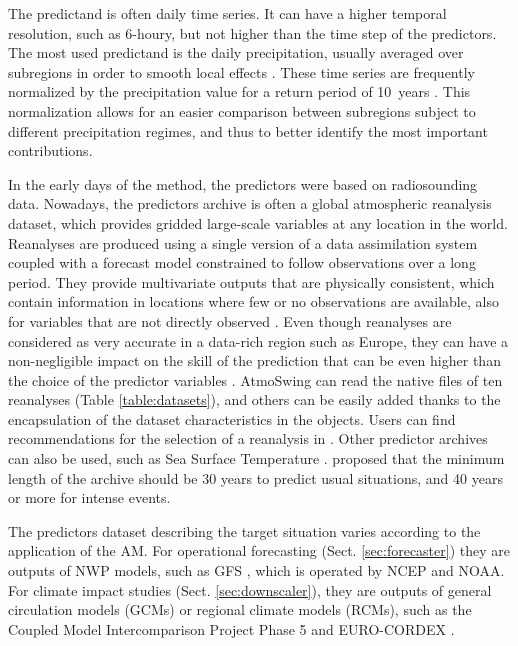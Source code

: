 \documentclass[review]{elsarticle}
\begin{document}
The predictand is often daily time series. It can have a higher temporal resolution, such as 6-houry, but not higher than the time step of the predictors. The most used predictand is the daily precipitation, usually averaged over subregions in order to smooth local effects \citep{Obled2002, Marty2012}. These time series are frequently normalized by the precipitation value for a return period of 10~years \citep{Djerboua2001}. This normalization allows for an easier comparison between subregions subject to different precipitation regimes, and thus to better identify the most important contributions.

In the early days of the method, the predictors were based on radiosounding data. Nowadays, the predictors archive is often a global atmospheric reanalysis dataset, which provides gridded large-scale variables at any location in the world. Reanalyses are produced using a single version of a data assimilation system coupled with a forecast model constrained to follow observations over a long period. They provide multivariate outputs that are physically consistent, which contain information in locations where few or no observations are available, also for variables that are not directly observed \citep{Gelaro2017}. Even though reanalyses are considered as very accurate in a data-rich region such as Europe, they can have a non-negligible impact on the skill of the prediction that can be even higher than the choice of the predictor variables \cite{Dayon2015, Horton2018b}. AtmoSwing can read the native files of ten reanalyses (Table \ref{table:datasets}), and others can be easily added thanks to the encapsulation of the dataset characteristics in the objects. Users can find recommendations for the selection of a reanalysis in \cite{Horton2018b}. Other predictor archives can also be used, such as Sea Surface Temperature \citep[SST, ][]{Reynolds2007}. \citet{Bontron2004} proposed that the minimum length of the archive should be 30 years to predict usual situations, and 40 years or more for intense events.

The predictors dataset describing the target situation varies according to the application of the AM. For operational forecasting (Sect. \ref{sec:forecaster}) they are outputs of NWP models, such as GFS \citep[Global Forecast System,][]{Kanamitsu1991,Kanamitsu1989}, which is operated by NCEP and NOAA. For climate impact studies (Sect. \ref{sec:downscaler}), they are outputs of general circulation models (GCMs) or regional climate models (RCMs), such as the Coupled Model Intercomparison Project Phase 5 \citep[CMIP5,][]{Taylor2012} and EURO-CORDEX \citep{Jacob2014}.
\end{document}
